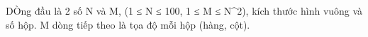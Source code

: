 DÒng đầu là 2 số N và M,  (1 ≤ N ≤ 100, 1 ≤ M ≤ N^2), kích thước hình vuông và số hộp. M dòng tiếp theo là tọa độ mỗi hộp (hàng, cột).  



\